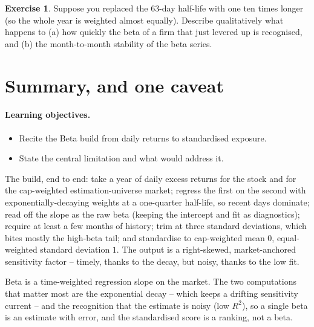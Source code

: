 \documentclass[11pt]{article}
\theoremstyle{definition}
\newtheorem{exercise}{Exercise}[section]
\theoremstyle{plain}
\theoremstyle{remark}
\begin{document}
\begin{exercise}
Suppose you replaced the $63$-day half-life with one ten times longer (so the whole year is weighted almost equally). Describe qualitatively what happens to (a) how quickly the beta of a firm that just levered up is recognised, and (b) the month-to-month stability of the beta series.
\end{exercise}

\section{Summary, and one caveat}\label{sec:summary}

\paragraph{Learning objectives.}
\begin{itemize}[leftmargin=1.4em,topsep=2pt]
  \item Recite the Beta build from daily returns to standardised exposure.
  \item State the central limitation and what would address it.
\end{itemize}

The build, end to end: take a year of daily excess returns for the stock and for the cap-weighted estimation-universe market; regress the first on the second with exponentially-decaying weights at a one-quarter half-life, so recent days dominate; read off the slope as the raw beta (keeping the intercept and fit as diagnostics); require at least a few months of history; trim at three standard deviations, which bites mostly the high-beta tail; and standardise to cap-weighted mean $0$, equal-weighted standard deviation $1$. The output is a right-skewed, market-anchored sensitivity factor -- timely, thanks to the decay, but noisy, thanks to the low fit.

\begin{keyresult}
Beta is a time-weighted regression slope on the market. The two computations that matter most are the exponential decay -- which keeps a drifting sensitivity current -- and the recognition that the estimate is noisy (low $R^2$), so a single beta is an estimate with error, and the standardised score is a ranking, not a beta.
\end{keyresult}
\end{document}
